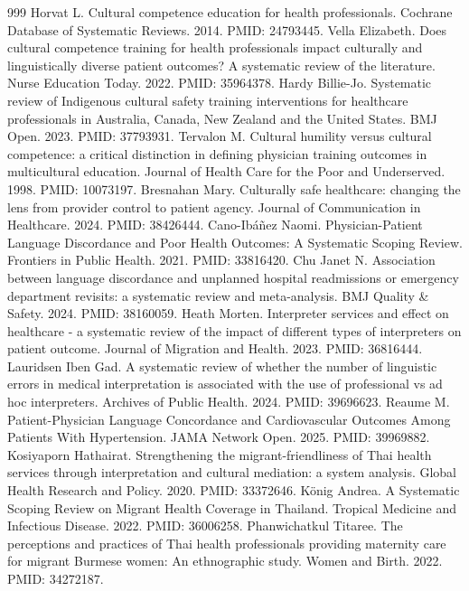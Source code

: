 \documentclass[11pt]{article}
\begin{document}
\begin{thebibliography}{999}
 Horvat L. Cultural competence education for health professionals. Cochrane Database of Systematic Reviews. 2014. PMID: 24793445.
 Vella Elizabeth. Does cultural competence training for health professionals impact culturally and linguistically diverse patient outcomes? A systematic review of the literature. Nurse Education Today. 2022. PMID: 35964378.
 Hardy Billie-Jo. Systematic review of Indigenous cultural safety training interventions for healthcare professionals in Australia, Canada, New Zealand and the United States. BMJ Open. 2023. PMID: 37793931.
 Tervalon M. Cultural humility versus cultural competence: a critical distinction in defining physician training outcomes in multicultural education. Journal of Health Care for the Poor and Underserved. 1998. PMID: 10073197.
 Bresnahan Mary. Culturally safe healthcare: changing the lens from provider control to patient agency. Journal of Communication in Healthcare. 2024. PMID: 38426444.
 Cano-Ibáñez Naomi. Physician-Patient Language Discordance and Poor Health Outcomes: A Systematic Scoping Review. Frontiers in Public Health. 2021. PMID: 33816420.
 Chu Janet N. Association between language discordance and unplanned hospital readmissions or emergency department revisits: a systematic review and meta-analysis. BMJ Quality \& Safety. 2024. PMID: 38160059.
 Heath Morten. Interpreter services and effect on healthcare - a systematic review of the impact of different types of interpreters on patient outcome. Journal of Migration and Health. 2023. PMID: 36816444.
 Lauridsen Iben Gad. A systematic review of whether the number of linguistic errors in medical interpretation is associated with the use of professional vs ad hoc interpreters. Archives of Public Health. 2024. PMID: 39696623.
 Reaume M. Patient-Physician Language Concordance and Cardiovascular Outcomes Among Patients With Hypertension. JAMA Network Open. 2025. PMID: 39969882.
 Kosiyaporn Hathairat. Strengthening the migrant-friendliness of Thai health services through interpretation and cultural mediation: a system analysis. Global Health Research and Policy. 2020. PMID: 33372646.
 König Andrea. A Systematic Scoping Review on Migrant Health Coverage in Thailand. Tropical Medicine and Infectious Disease. 2022. PMID: 36006258.
 Phanwichatkul Titaree. The perceptions and practices of Thai health professionals providing maternity care for migrant Burmese women: An ethnographic study. Women and Birth. 2022. PMID: 34272187.

\end{thebibliography}
\end{document}
